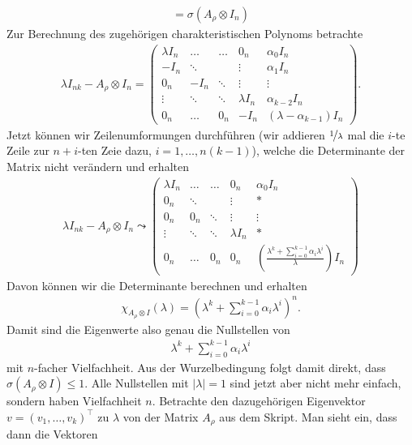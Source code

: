 \begin{solution}
\begin{align*}
  = \sigma(A_{\rho} \otimes I_n)
\end{align*}
Zur Berechnung des zugehörigen charakteristischen Polynoms betrachte
\begin{align*}
\lambda I_{nk} - A_{\rho} \otimes I_n = \begin{pmatrix}
\lambda I_n & \hdots & \hdots & 0_n & \alpha_0I_n \\
-I_n & \ddots & & \vdots & \alpha_1I_n \\
0_n & -I_n & \ddots & \vdots & \vdots \\
\vdots & \ddots & \ddots & \lambda I_n & \alpha_{k-2}I_n \\
0_n & \hdots & 0_n & -I_n & (\lambda-  \alpha_{k-1})I_n
\end{pmatrix}.
\end{align*}
Jetzt können wir Zeilenumformungen durchführen
(wir addieren $\nicefrac{1}{\lambda}$ mal die $i$-te Zeile zur $n+i$-ten Zeie dazu, $i = 1,\dots,n(k-1)$), welche die Determinante der
Matrix nicht verändern und erhalten
\begin{align*}
  \lambda I_{nk} - A_{\rho} \otimes I_n \leadsto
  \begin{pmatrix}
  \lambda I_n & \hdots & \hdots & 0_n & \alpha_0I_n \\
  0_n & \ddots & & \vdots & * \\
  0_n & 0_n & \ddots & \vdots & \vdots \\
  \vdots & \ddots & \ddots & \lambda I_n & * \\
  0_n & \hdots & 0_n & 0_n & (\frac{\lambda^k + \sum_{i = 0}^{k-1}\alpha_i\lambda^i}{\lambda})I_n
  \end{pmatrix}
\end{align*}
Davon können wir die Determinante berechnen und erhalten
\begin{align*}
  \chi_{A_{\rho} \otimes I}(\lambda) =
  \left(\lambda^k + \sum_{i = 0}^{k-1}\alpha_i\lambda^i\right)^n.
\end{align*}
Damit sind die Eigenwerte also genau die Nullstellen von
\begin{align*}
  \lambda^k + \sum_{i = 0}^{k-1}\alpha_i\lambda^i
\end{align*}
mit $n$-facher Vielfachheit. Aus der Wurzelbedingung folgt damit direkt, dass
$\sigma(A_{\rho} \otimes I) \leq 1$. Alle Nullstellen mit $|\lambda| = 1$
sind jetzt aber nicht mehr einfach, sondern haben Vielfachheit $n$.
Betrachte den dazugehörigen Eigenvektor $v = (v_1,\dots,v_k)^{\top}$ zu $\lambda$ von der Matrix $A_{\rho}$ aus dem Skript.
Man sieht ein, dass dann die Vektoren

\end{solution}
